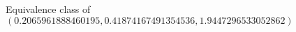 \documentclass[preview]{standalone}
\begin{document}
\begin{center}
Equivalence class of $(0.2065961888460195, 0.41874167491354536, 1.9447296533052862)$
\end{center}
\end{document}
